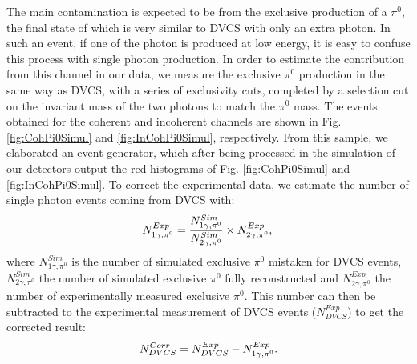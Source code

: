 \documentclass[aps,prc,preprint,superscriptaddress]{revtex4}
\begin{document}
The main contamination is expected to be 
from the exclusive production of a $\pi^0$, the final state of which is very similar to DVCS with 
only an extra photon. In such an event, if one of the photon is produced at low energy, it is 
easy to confuse this process with single photon production. In order to estimate the contribution from
this channel in our data, we measure the exclusive $\pi^0$ production in the same way as DVCS, with 
a series of exclusivity cuts, completed by a selection cut on the invariant mass of the two photons
to match the $\pi^0$ mass. The events obtained for the coherent and incoherent
channels are shown in Fig. \ref{fig:CohPi0Simul} and \ref{fig:InCohPi0Simul}, respectively. From 
this sample, we elaborated an event generator, which after being processed
in the simulation of our detectors output the red histograms of Fig. \ref{fig:CohPi0Simul} and 
\ref{fig:InCohPi0Simul}. To correct the experimental data, we estimate the number of single photon 
events coming from DVCS with:
\begin{equation}
	N_{1\gamma,\pi^0}^{Exp} = \frac{N_{1\gamma,\pi^0}^{Sim}}{N_{2\gamma,\pi^0}^{Sim}} \times N_{2\gamma,\pi^0}^{Exp},\\
\end{equation}
where $N_{1\gamma,\pi^0}^{Sim}$ is the number of simulated exclusive $\pi^0$ mistaken for DVCS events,
$N_{2\gamma,\pi^0}^{Sim}$ the number of simulated exclusive $\pi^0$ fully reconstructed and $N_{2\gamma,\pi^0}^{Exp}$
the number of experimentally measured exclusive $\pi^0$. This number can then be subtracted to
the experimental measurement of DVCS events ($N_{DVCS}^{Exp}$) to get the corrected result: 
\begin{equation}
	N_{DVCS}^{Corr} = N_{DVCS}^{Exp} - N_{1\gamma,\pi^0}^{Exp}.\\
\end{equation}
\end{document}
